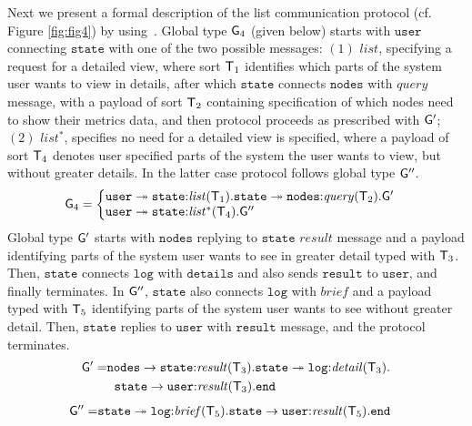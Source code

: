 Next we present a formal description of the list communication protocol (cf. Figure \ref{fig:fig4}) by using~\cite{HuY17}.
Global type ${\sf G}_4$ (given below) starts with $\mathtt{user}$ connecting $\mathtt{state}$ with one of the two possible messages: 
$(1)$ $\mathit{list}$, specifying a request for a detailed view, where sort ${\mathsf T}_1$ identifies which parts of the system user wants to view in details, after which $\mathtt{state}$ connects $\mathtt{nodes}$ with $\mathit{query}$ message, with a payload of sort ${\mathsf T}_2$  containing specification of which nodes need to show their metrics data, and then protocol proceeds as prescribed with ${\sf G}'$; 
$(2)$ $\mathit{list^*}$, specifies no need for a detailed view is specified, where a payload of sort ${\mathsf T}_4$ denotes user specified parts of the system the user wants to view, but without greater details. In the latter case protocol follows global type ${\sf G}''$.
\begin{align*}
\G_4 &= 
\left\{
\begin{array}{@{}l@{}}  
\mathtt{user} \twoheadrightarrow \mathtt{state}{:}\mathit{list}(\T_1).\mathtt{state}\twoheadrightarrow\mathtt{nodes}{:}\mathit{query}(\T_2). \G' \\
\mathtt{user} \twoheadrightarrow \mathtt{state}{:}\mathit{list^*}(\T_4).\G''
\end{array} \right.
\end{align*}
Global type ${\sf G}'$ starts with $\mathtt{nodes}$ replying to $\mathtt{state}$ $\mathit{result}$ message and a payload identifying parts of the system user wants to see in greater detail typed with ${\mathsf T}_3$. Then, $\mathtt{state}$ connects $\mathtt{log}$ with $\mathtt{details}$ and also sends $\mathtt{result}$ to $\mathtt{user}$, and finally terminates. 
In ${\sf G}''$, $\mathtt{state}$ also connects $\mathtt{log}$ with $\mathit{brief}$ and a payload typed with ${\mathsf T}_5$ identifying parts of the system user wants to see without greater detail. Then, $\mathtt{state}$ replies to $\mathtt{user}$ with $\mathtt{result}$ message, and the protocol terminates.
\begin{align*}
\begin{split}
	{\sf G}' =  & 
	\mathtt{nodes}\to\mathtt{state}{:}\mathit{result}({\mathsf T}_3).\mathtt{state}\twoheadrightarrow \mathtt{log}{:}\mathit{detail}({\mathsf T}_3). \\
	& \hspace{2mm}
	\mathtt{state}\to\mathtt{user}{:}\mathit{result}({\mathsf T}_3).\mathtt{end}
\end{split}
\end{align*}
\begin{align*}
	{\sf G}'' = &
	\mathtt{state}\twoheadrightarrow \mathtt{log}{:}\mathit{brief}({\mathsf T}_5).\mathtt{state}\to\mathtt{user}{:}\mathit{result}({\mathsf T}_5).\mathtt{end}
\end{align*}

